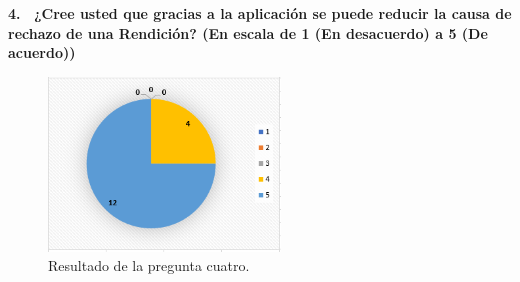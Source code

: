 \newpage
\textbf{4.  ¿Cree usted que gracias a la aplicación se puede reducir la causa de rechazo de una Rendición? (En escala de 1 (En desacuerdo) a 5 (De acuerdo))}

\begin{figure}[h!]
    \centering
    \includegraphics[width=0.55\textwidth]{Imagenes/Pregunta4.1.png}
    \caption{\label{fig: Pregunta4}Resultado de la pregunta cuatro.}
\end{figure}
